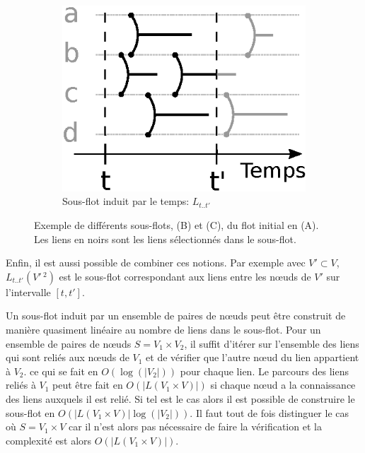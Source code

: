 \begin{figure}[]
\begin{subfigure}{0.25\linewidth}
		\includegraphics[width=\linewidth]{img/Intro/sous_flots2.eps}\hfill
		\caption{Sous-flot induit par le temps:  $L_{t..t'}$}
		\label{fig:exemple_sous_flot2}	
	\end{subfigure}
	\caption{Exemple de différents sous-flots, (B) et (C), du flot initial en (A). Les liens en noirs sont les liens sélectionnés dans le sous-flot. }
\label{fig:exemple_sous_flot}
\end{figure}
Enfin, il est aussi possible de combiner ces notions.
Par exemple avec $V' \subset V$, $L_{t..t'}(V'\,^2)$ est le sous-flot correspondant aux liens entre les n\oe uds de $V'$ sur l'intervalle $[t, t']$.

\bigskip

Un sous-flot induit par un ensemble de paires de n\oe uds peut être construit de manière quasiment linéaire au nombre de liens dans le sous-flot.
Pour un ensemble de paires de n\oe uds $S= V_1 \times V_2$, il suffit d'itérer sur l'ensemble des liens qui sont reliés aux n\oe uds de $V_1$ et de vérifier que l'autre n\oe ud du lien appartient à $V_2$. ce qui se fait en $O(\log(|V_2|))$ pour chaque lien.
Le parcours des liens reliés à $V_1$ peut être fait en $O(|L(V_1 \times V)|)$ si chaque n\oe ud a la connaissance des liens auxquels il est relié.
Si tel est le cas alors il est possible de construire le sous-flot en $O(|L(V_1\times V)|\log(|V_2|))$.
Il faut tout de fois distinguer le cas où $S= V_1 \times V$ car il n'est alors pas nécessaire de faire la vérification et la complexité est alors $O(|L(V_1\times V)|)$.

